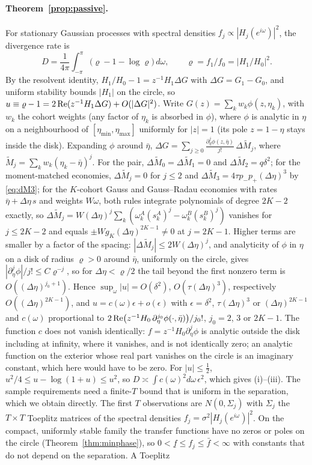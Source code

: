 \paragraph{Theorem~\ref{prop:passive}.} For stationary Gaussian processes with spectral densities $f_j\propto|H_j(e^{i\omega})|^2$, the divergence rate is
\[
D=\frac1{4\pi}\int_{-\pi}^{\pi}\bigl(\varrho-1-\log\varrho\bigr)\,d\omega,\qquad \varrho=f_1/f_0=|H_1/H_0|^2 .
\] By the resolvent identity, $H_1/H_0-1=z^{-1}H_1\Delta G$ with $\Delta G=G_1-G_0$, and uniform stability bounds $|H_1|$ on the circle, so $u\equiv\varrho-1=2\,{\rm Re}(z^{-1}H_1\Delta G)+O(|\Delta G|^2)$. Write $G(z)=\sum_kw_k\phi(z,\eta_k)$, with $w_k$ the cohort weights (any factor of $\eta_k$ is absorbed in $\phi$), where $\phi$ is analytic in $\eta$ on a neighbourhood of $[\eta_{\min},\eta_{\max}]$ uniformly for $|z|=1$ (its pole $z=1-\eta$ stays inside the disk). Expanding $\phi$ around $\bar\eta$, $\Delta G=\sum_{j\ge0}\frac{\partial_\eta^j\phi(z,\bar\eta)}{j!}\,\Delta\tilde M_j$, where $\tilde M_j=\sum_kw_k(\eta_k-\bar\eta)^j$. For the pair, $\Delta\tilde M_0=\Delta\tilde M_1=0$ and $\Delta\tilde M_2=q\delta^2$; for the moment-matched economies, $\Delta\tilde M_j=0$ for $j\le2$ and $\Delta\tilde M_3=4\tau p_-p_+(\Delta\eta)^3$ by \eqref{eq:dM3}; for the $K$-cohort Gauss and Gauss--Radau economies with rates $\bar\eta+\Delta\eta\,s$ and weights $W\omega$, both rules integrate polynomials of degree $2K-2$ exactly, so $\Delta\tilde M_j=W(\Delta\eta)^j\sum_k(\omega^A_k(s^A_k)^j-\omega^B_k(s^B_k)^j)$ vanishes for $j\le2K-2$ and equals $\pm Wg_K(\Delta\eta)^{2K-1}\neq0$ at $j=2K-1$. Higher terms are smaller by a factor of the spacing: $|\Delta\tilde M_j|\le2W(\Delta\eta)^j$, and analyticity of $\phi$ in $\eta$ on a disk of radius $\varrho>0$ around $\bar\eta$, uniformly on the circle, gives $|\partial_\eta^j\phi|/j!\le C\varrho^{-j}$, so for $\Delta\eta<\varrho/2$ the tail beyond the first nonzero term is $O((\Delta\eta)^{j_0+1})$. Hence $\sup_\omega|u|=O(\delta^2)$, $O(\tau(\Delta\eta)^3)$, respectively $O((\Delta\eta)^{2K-1})$, and $u=c(\omega)\epsilon+o(\epsilon)$ with $\epsilon=\delta^2$, $\tau(\Delta\eta)^3$ or $(\Delta\eta)^{2K-1}$ and $c(\omega)$ proportional to $2\,{\rm Re}\bigl(z^{-1}H_0\,\partial^{j_0}_\eta\phi(\cdot,\bar\eta)\bigr)/j_0!$, $j_0=2$, $3$ or $2K-1$. The function $c$ does not vanish identically: $f=z^{-1}H_0\partial^j_\eta\phi$ is analytic outside the disk including at infinity, where it vanishes, and is not identically zero; an analytic function on the exterior whose real part vanishes on the circle is an imaginary constant, which here would have to be zero. For $|u|\le\frac12$, $u^2/4\le u-\log(1+u)\le u^2$, so $D\asymp\int c(\omega)^2d\omega\,\epsilon^2$, which gives (i)--(iii). The sample requirements need a finite-$T$ bound that is uniform in the separation, which we obtain directly. The first $T$ observations are $N(0,\Sigma_j)$ with $\Sigma_j$ the $T\times T$ Toeplitz matrices of the spectral densities $f_j=\sigma^2|H_j(e^{i\omega})|^2$. On the compact, uniformly stable family the transfer functions have no zeros or poles on the circle (Theorem~\ref{thm:minphase}), so $0<\underline f\le f_j\le\bar f<\infty$ with constants that do not depend on the separation. A Toeplitz \]
